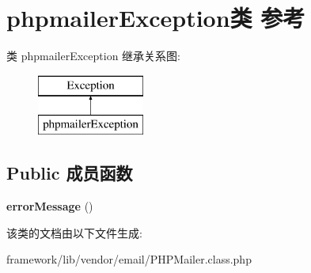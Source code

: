 \hypertarget{classphpmailerException}{\section{phpmailer\+Exception类 参考}
\label{classphpmailerException}
}
类 phpmailer\+Exception 继承关系图\+:\begin{figure}[H]
\begin{center}
\leavevmode
\includegraphics[height=2.000000cm]{classphpmailerException}
\end{center}
\end{figure}
\subsection*{Public 成员函数}
\begin{DoxyCompactItemize}
\item 
\hypertarget{classphpmailerException_aeea8c4a8f2abac4f1ca70c6beb4d356d}{{\bfseries error\+Message} ()}\label{classphpmailerException_aeea8c4a8f2abac4f1ca70c6beb4d356d}

\end{DoxyCompactItemize}


该类的文档由以下文件生成\+:\begin{DoxyCompactItemize}
\item 
framework/lib/vendor/email/P\+H\+P\+Mailer.\+class.\+php\end{DoxyCompactItemize}
